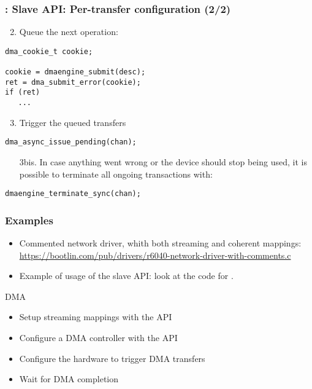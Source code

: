 \begin{frame}[fragile]
  \frametitle{: Slave API: Per-transfer configuration (2/2)}
  \begin{enumerate}
    \setcounter{enumi}{1}
  \item Queue the next operation:
  \end{enumerate}
  \begin{verbatim}
dma_cookie_t cookie;

cookie = dmaengine_submit(desc);
ret = dma_submit_error(cookie);
if (ret)
   ...
\end{verbatim}
  \begin{enumerate}
    \setcounter{enumi}{2}
  \item Trigger the queued transfers
  \end{enumerate}
  \begin{verbatim}
dma_async_issue_pending(chan);
\end{verbatim}
  \begin{enumerate}
  \item[3bis.] In case anything went wrong or the device should stop being
    used, it is possible to terminate all ongoing transactions with:
  \end{enumerate}
  \begin{verbatim}
dmaengine_terminate_sync(chan);
\end{verbatim}
\end{frame}

\begin{frame}
  \frametitle{Examples}
  \begin{itemize}
  \item Commented network driver, whith both streaming and coherent
    mappings:\\
    \small \url{https://bootlin.com/pub/drivers/r6040-network-driver-with-comments.c}
  \item Example of usage of the slave API: look at the code for
    .
  \end{itemize}
\end{frame}

\setuplabframe
{DMA}
{
  \begin{itemize}
  \item Setup streaming mappings with the  API
  \item Configure a DMA controller with the  API
  \item Configure the hardware to trigger DMA transfers
  \item Wait for DMA completion
  \end{itemize}
}
